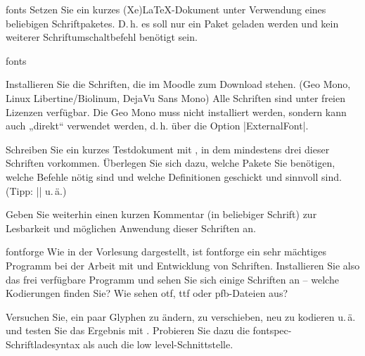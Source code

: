 \documentclass[
	blatt=2,
	ausgabe=23.\,04.\,2010,
	rückgabe=30.\,04.\,2010
]{lcourse-hd}
\begin{document}
\begin{exercise}[name=Erste Schritte mit Schriften,punkte=3,abgabe = Quelltext per Mail{,} das fertige Dokument als Ausdruck.]{fonts}
Setzen Sie ein kurzes (Xe)\LaTeX-Dokument unter Verwendung eines beliebigen Schriftpaketes. D.\,h. es soll nur ein Paket geladen werden und kein weiterer Schriftumschaltbefehl benötigt sein.
\end{exercise}

\begin{exercise}[name=Die nächsten Schriftschritte,punkte=7,abgabe = Quelltext per Mail{,} das fertige Dokument als Ausdruck.]{fonts}

Installieren Sie die Schriften, die im Moodle zum Download stehen. (Geo Mono, Linux Libertine/Biolinum, DejaVu Sans Mono) Alle Schriften sind unter freien Lizenzen verfügbar. Die Geo Mono muss nicht installiert werden, sondern kann auch „direkt“ verwendet werden, d.\,h. über die Option |ExternalFont|.

Schreiben Sie ein kurzes Testdokument mit \XeLaTeX, in dem mindestens drei dieser Schriften vorkommen. Überlegen Sie sich dazu, welche Pakete Sie benötigen, welche Befehle nötig sind und welche Definitionen geschickt und sinnvoll sind. (Tipp: |\setmainfont| u.\,ä.)

Geben Sie weiterhin einen kurzen Kommentar (in beliebiger Schrift) zur Lesbarkeit und möglichen Anwendung dieser Schriften an.
\end{exercise}

\begin{expertexercise}[
	name=fontforge,
	abgabe = Keine Abgabe nötig.
]{fontforge}
Wie in der Vorlesung dargestellt, ist fontforge ein sehr mächtiges Programm bei der Arbeit mit und Entwicklung von Schriften. Installieren Sie also das frei verfügbare Programm und sehen Sie sich einige Schriften an – welche Kodierungen finden Sie? Wie sehen otf, ttf oder pfb-Dateien aus?

Versuchen Sie, ein paar Glyphen zu ändern, zu verschieben, neu zu kodieren u.\,ä. und testen Sie das Ergebnis mit \XeLaTeX. Probieren Sie dazu die fontspec-Schriftladesyntax als auch die low level-Schnittstelle.
\end{expertexercise}
\end{document}
